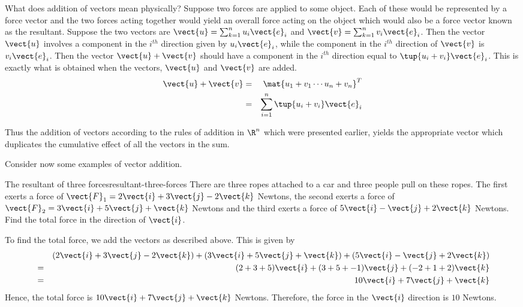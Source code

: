 What does addition of vectors mean physically? Suppose two forces are
applied to some object. Each of these would be represented by a force vector
and the two forces acting together would yield an overall force acting on
the object which would also be a force vector known as the
resultant. Suppose the two vectors are $\vect{u}=\sum_{k=1}^{n}u_{i}\vect{e}_{i}$ and $\vect{v}=\sum_{k=1}^{n}v_{i}\vect{e}_{i}$. Then the vector $\vect{u}$ involves a component in the $
i^{th}$ direction given by $u_{i}\vect{e}_{i}$, while the component in the $i^{th}$
direction of $\vect{v}$ is $v_{i}\vect{e}_{i}$. Then the vector $\vect{u} + \vect{v}$ should have a component in the $i^{th}$
direction equal to $\tup{u_{i}+v_{i}} \vect{e}_{i}$. This is
exactly what is obtained when the vectors, $\vect{u}$ and $\vect{v}$ are
added.
\begin{eqnarray*}
\vect{u}+\vect{v}& =&\mat{u_{1}+v_{1} \cdots u_{n}+v_{n}}^T  \\
& =&\sum_{i=1}^{n}\tup{u_{i}+v_{i}} \vect{e}_{i}
\end{eqnarray*}

Thus the addition of vectors according to the rules of addition in $\R^{n}$ which were presented earlier, yields the appropriate vector which
duplicates the cumulative effect of all the vectors in the sum.

Consider now some examples of vector addition.

\begin{example}{The resultant of three forces}{resultant-three-forces}
There are three ropes attached to a car and three people pull on these
ropes. The first exerts a force of $\vect{F}_1 = 
2\vect{i} + 3\vect{j} -2 \vect{k}$ Newtons, the second exerts a force of $\vect{F}_2
=
3\vect{i}+5\vect{j}+\vect{k}$ Newtons
and the third exerts a force of $5\vect{i}-\vect{j}+2\vect{k}$ Newtons. Find
the total force in the direction of $\vect{i}$.
\end{example}

\begin{solution}
To find the total force, we add the vectors as described above. 
This is given by 
\begin{eqnarray*}
&&(2\vect{i}+3\vect{j}-2\vect{k}) + (3\vect{i}+5\vect{j}+\vect{k}) + (5\vect{i}-\vect{j}+2\vect{k})\\
&=&
(2  + 3 + 5) \vect{i} + (3 + 5 + -1) \vect{j} + (-2+1+2) \vect{k} \\
&=&
10 \vect{i} + 7 \vect{j} + \vect{k}
\end{eqnarray*}
Hence, the total force is  $10\vect{i}+7\vect{j}+\vect{k}$ Newtons. Therefore, the force in the $
\vect{i}$ direction is $10$ Newtons.
\end{solution}

